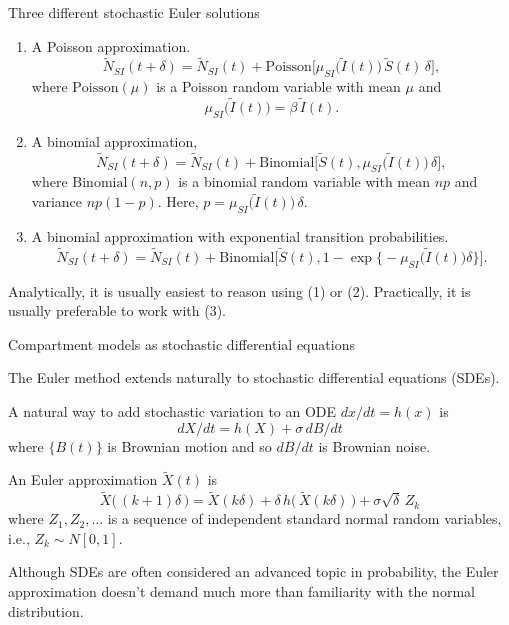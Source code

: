 \begin{frame}{Three different stochastic Euler solutions}

  \vspace{-3mm}

  \begin{enumerate}[(1)]
  \item A Poisson approximation.
    $$\tilde N_{SI}(t+\delta)= \tilde N_{SI}(t) + \mathrm{Poisson}\big[\mu_{SI}\big(\tilde I(t)\big) \, \tilde S(t) \,\delta\big],$$
    where $\mathrm{Poisson}(\mu)$ is a Poisson random variable with mean $\mu$ and 
    $$\mu_{SI}\big(\tilde I(t)\big) = \beta\, \tilde I(t).$$

  \item A binomial approximation,
    $$\tilde N_{SI}(t+\delta) = \tilde N_{SI}(t) + \mathrm{Binomial}\big[\tilde S(t),\mu_{SI}\big(\tilde I(t)\big) \, \delta\big],$$
    where $\mathrm{Binomial}(n,p)$ is a binomial random variable with mean $np$ and variance $np(1-p)$. Here, $p=\mu_{SI}\big(\tilde I(t)\big) \, \delta$.

  \item A binomial approximation with exponential transition probabilities. 
    $$ \tilde N_{SI}(t+\delta)= \tilde N_{SI}(t) + \mathrm{Binomial}\big[\tilde S(t),1-\exp\big\{-\mu_{SI}\big(\tilde I(t)\big) \delta\big\}\big].$$

  \end{enumerate}

  \hrulefill

  Analytically, it is usually easiest to reason using (1) or (2).
  Practically, it is usually preferable to work with (3). 

\end{frame}

\begin{frame}[allowframebreaks=0.8]{Compartment models as stochastic differential equations}
  \bi
\item The Euler method extends naturally to stochastic differential equations (SDEs).
\item A natural way to add stochastic variation to an ODE $dx/dt=h(x)$ is
  $$ dX/dt = h(X) + \sigma \, dB/dt$$
  where $\{B(t)\}$ is Brownian motion and so $dB/dt$ is Brownian noise.
\item An Euler approximation $\tilde X(t)$ is 
  $$ \tilde X\big( \,(k+1)\delta\,\big) = \tilde X( k\delta) + \delta\, h\big(\, \tilde X(k\delta)\,\big) + \sigma \sqrt{\delta} \, Z_k$$
  where $Z_1,Z_2,\dots$ is a sequence of independent standard normal random variables, i.e.,  $Z_k\sim N[0,1]$.
\item Although SDEs are often considered an advanced topic in probability, the Euler approximation doesn't demand much more than familiarity with the normal distribution.
  \ei
\end{frame}


